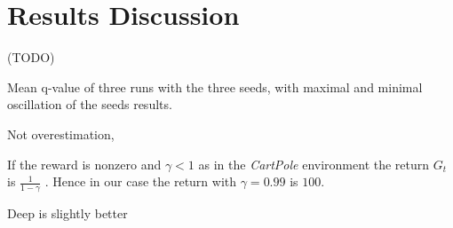 \section{Results Discussion}

(TODO)


Mean q-value of three runs with the three seeds, with maximal and minimal oscillation of the seeds results.

Not overestimation, 

If the reward is nonzero and $\gamma < 1$ as in the \textit{CartPole} environment the return $G_t$ is $\frac{1}{1 - \gamma}$ \cite{Sutton:1998:IRL:551283}. Hence in our case the return with $\gamma = 0.99$ is $100$.


Deep is slightly better

% 


